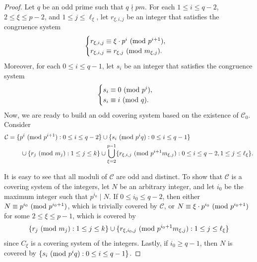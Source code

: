 \documentclass[12pt]{article}
\theoremstyle{definition}
\renewcommand{\mod}[2]{#1\textup{ (mod }#2\textup{)}}
\begin{document}
\begin{proof}
Let $q$ be an odd prime such that $q\nmid pm$. For each $1\leq i\leq q-2$, $2\leq\xi\leq p-2$, and $1\leq j\leq\ell_\xi$, let $r_{\xi,i,j}$ be an integer that satisfies the congruence system
$$\begin{cases}
r_{\xi,i,j}\equiv\mod{\xi\cdot p^i}{p^{i+1}},\\
r_{\xi,i,j}\equiv\mod{r_{\xi,j}}{m_{\xi,j}}.
\end{cases}$$
Moreover, for each $0\leq i\leq q-1$, let $s_i$ be an integer that satisfies the congruence system
$$\begin{cases}
s_i\equiv\mod{0}{p^i},\\
s_i\equiv\mod{i}{q}.
\end{cases}$$
Now, we are ready to build an odd covering system based on the existence of $\mathcal{C}_0$. Consider
\begin{align*}
\mathcal{C}&=\{\mod{p^i}{p^{i+1}}:0\leq i\leq q-2\}\cup\{\mod{s_i}{p^iq}:0\leq i\leq q-1\}\\
&\hspace{20pt}\cup\{\mod{r_j}{m_j}:1\leq j\leq k\}\cup\bigcup_{\xi=2}^{p-1}\{\mod{r_{\xi,i,j}}{p^{i+1}m_{\xi,j}}:0\leq i\leq q-2,1\leq j\leq\ell_\xi\}.
\end{align*}

It is easy to see that all moduli of $\mathcal{C}$ are odd and distinct. To show that $\mathcal{C}$ is a covering system of the integers, let $N$ be an arbitrary integer, and let $i_0$ be the maximum integer such that $p^{i_0}\mid N$. If $0\leq i_0\leq q-2$, then either $N\equiv\mod{p^{i_0}}{p^{i_0+1}}$, which is trivially covered by $\mathcal{C}$, or $N\equiv\mod{\xi\cdot p^{i_0}}{p^{i_0+1}}$ for some $2\leq\xi\leq p-1$, which is covered by 
$$\{\mod{r_j}{m_j}:1\leq j\leq k\}\cup\{\mod{r_{\xi,i_0,j}}{p^{i_0+1}m_{\xi,j}}:1\leq j\leq\ell_\xi\}$$
since $C_\xi$ is a covering system of the integers. Lastly, if $i_0\geq q-1$, then $N$ is covered by $\{\mod{s_i}{p^iq}:0\leq i\leq q-1\}$.
\end{proof}
\end{document}
